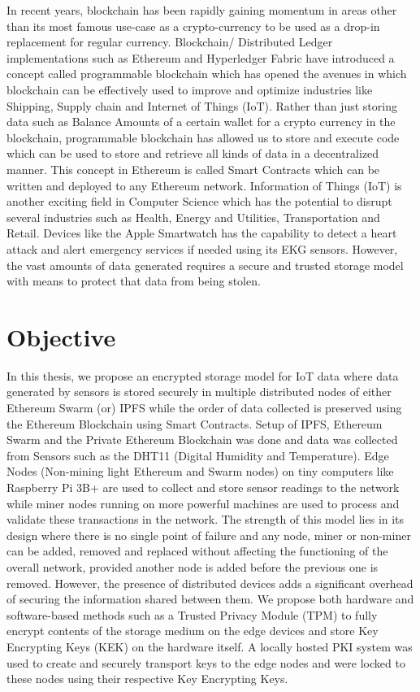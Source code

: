 \documentclass[11pt,openright]{report}
\begin{document}
In recent years, blockchain has been rapidly gaining momentum in areas other than its most famous use-case as a crypto-currency to be used as a drop-in replacement for regular currency. Blockchain/ Distributed Ledger implementations such as Ethereum and Hyperledger Fabric have introduced a concept called programmable blockchain which has opened the avenues in which blockchain can be effectively used to improve and optimize industries like Shipping, Supply chain and Internet of Things (IoT). Rather than just storing data such as Balance Amounts of a certain wallet for a crypto currency in the blockchain, programmable blockchain has allowed us to store and execute code which can be used to store and retrieve all kinds of data in a decentralized manner. This concept in Ethereum is called Smart Contracts which can be written and deployed to any Ethereum network. 
Information of Things (IoT) is another exciting field in Computer Science which has the potential to disrupt several industries such as Health, Energy and Utilities, Transportation and Retail. Devices like the Apple Smartwatch has the capability to detect a heart attack and alert emergency services if needed using its EKG sensors. However, the vast amounts of data generated requires a secure and trusted storage model with means to protect that data from being stolen. 




\section{Objective}\label{section:objective}
In this thesis, we propose an encrypted storage model for IoT data where data generated by sensors is stored securely in multiple distributed nodes of either Ethereum Swarm (or) IPFS while the order of data collected is preserved using the Ethereum Blockchain using Smart Contracts. Setup of IPFS, Ethereum Swarm and the Private Ethereum Blockchain was done and data was collected from Sensors such as the DHT11 (Digital Humidity and Temperature). Edge Nodes (Non-mining light Ethereum and Swarm nodes) on tiny computers like Raspberry Pi 3B+ are used to collect and store sensor readings to the network while miner nodes running on more powerful machines are used to process and validate these transactions in the network. The strength of this model lies in its design where there is no single point of failure and any node, miner or non-miner can be added, removed and replaced without affecting the functioning of the overall  network, provided another node is added before the previous one is removed. However, the presence of distributed devices adds a significant overhead of securing the information shared between them. We propose both hardware and software-based methods such as a Trusted Privacy Module (TPM) to fully encrypt contents of the storage medium on the edge devices and store Key Encrypting Keys (KEK) on the hardware itself. A locally hosted PKI system was used to create and securely transport keys to the edge nodes and were locked to these nodes using their respective Key Encrypting Keys.
\end{document}
